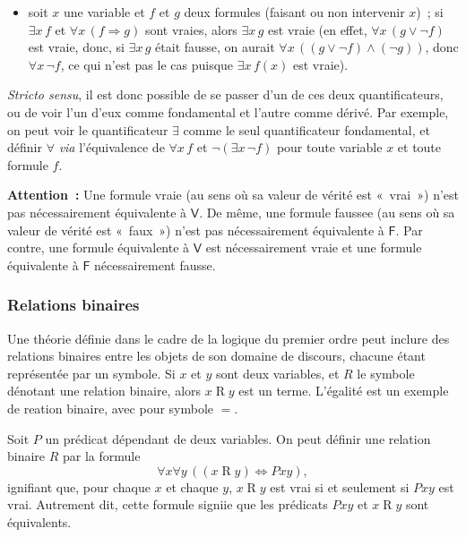 \begin{itemize}
    \item soit $x$ une variable et $f$ et $g$ deux formules (faisant ou non intervenir $x$) ; si $\exists x \, f$ et $\forall x \, (f \Rightarrow g)$ sont vraies, alors $\exists x \, g$ est vraie (en effet, $\forall x \, (g \vee \neg f)$ est vraie, donc, si $\exists x \, g$ était fausse, on aurait $\forall x \, ((g \vee \neg f) \wedge (\neg g))$, donc $\forall x \, \neg f$, ce qui n'est pas le cas puisque $\exists x \, f(x)$ est vraie). 
\end{itemize}

\textit{Stricto sensu}, il est donc possible de se passer d'un de ces deux quantificateurs, ou de voir l'un d'eux comme fondamental et l'autre comme dérivé. 
Par exemple, on peut voir le quantificateur $\exists$ comme le seul quantificateur fondamental, et définir $\forall$ \textit{via} l'équivalence de $\forall x \, f$ et $\neg \left( \exists x \, \neg f \right)$ pour toute variable $x$ et toute formule $f$. 

\medskip

\noindent\textbf{Attention :} 
    Une formule vraie (au sens où sa valeur de vérité est « vrai ») n'est pas nécessairement équivalente à $\mathsf{V}$.
    De même, une formule faussee (au sens où sa valeur de vérité est « faux ») n'est pas nécessairement équivalente à $\mathsf{F}$.
    Par contre, une formule équivalente à $\mathsf{V}$ est nécessairement vraie et une formule équivalente à $\mathsf{F}$ nécessairement fausse.

\subsubsection{Relations binaires} 

Une théorie définie dans le cadre de la logique du premier ordre peut inclure des relations binaires entre les objets de son domaine de discours, chacune étant représentée par un symbole. 
Si $x$ et $y$ sont deux variables, et $R$ le symbole dénotant une relation binaire, alors $x \mathrel{R} y$ est un terme. 
L'égalité est un exemple de reation binaire, avec pour symbole $=$. 

Soit $P$ un prédicat dépendant de deux variables. 
On peut définir une relation binaire $R$ par la formule 
\begin{equation*}
    \forall x \forall y \, ((x \mathrel{R} y) \Leftrightarrow P x y),
\end{equation*}
ignifiant que, pour chaque $x$ et chaque $y$, $x \mathrel{R} y$ est vrai si et seulement si $P x y$ est vrai. 
Autrement dit, cette formule signiie que les prédicats $P x y$ et $x \mathrel{R} y$ sont équivalents.

